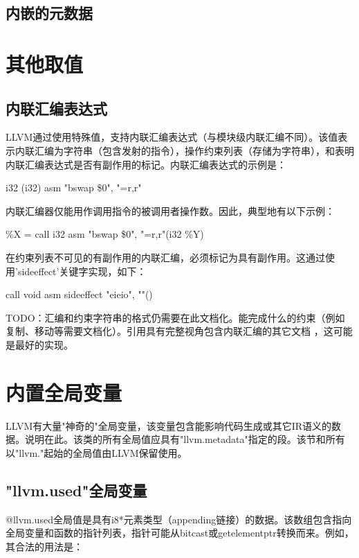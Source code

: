 \documentclass[12pt,a4paper]{article}
\begin{document}
{\subsection{内嵌的元数据} %




\section{其他取值}

\subsection{内联汇编表达式} %

LLVM通过使用特殊值，支持内联汇编表达式（与模块级内联汇编不同）。该值表示内联汇编为字符串（包含发射的指令），操作约束列表（存储为字符串），和表明内联汇编表达式是否有副作用的标记。内联汇编表达式的示例是：

i32 (i32) asm "bswap \$0", "=r,r"

内联汇编器仅能用作调用指令的被调用者操作数。因此，典型地有以下示例：

\%X = call i32 asm "bswap \$0", "=r,r"(i32 \%Y)

在约束列表不可见的有副作用的内联汇编，必须标记为具有副作用。这通过使用'sideeffect'关键字实现，如下：

call void asm sideeffect "eieio", ""()

TODO：汇编和约束字符串的格式仍需要在此文档化。能完成什么的约束（例如复制、移动等需要文档化）。引用具有完整视角包含内联汇编的其它文档
，这可能是最好的实现。

\section{内置全局变量}

LLVM有大量"神奇的"全局变量，该变量包含能影响代码生成或其它IR语义的数据。说明在此。该类的所有全局值应具有"llvm.metadata"指定的段。该节和所有以"llvm."起始的全局值由LLVM保留使用。

\subsection{"llvm.used"全局变量} %

@llvm.used全局值是具有i8*元素类型（appending链接）的数据。该数组包含指向全局变量和函数的指针列表，指针可能从bitcast或getelementptr转换而来。例如，其合法的用法是：

}
\end{document}

